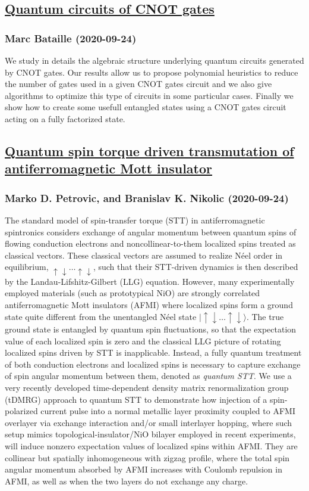 \subsection*{\href{http://arxiv.org/abs/2009.13247v2}{Quantum circuits of CNOT gates}}
\subsubsection*{Marc Bataille (2020-09-24)}
We study in details the algebraic structure underlying quantum circuits
generated by CNOT gates. Our results allow us to propose polynomial heuristics
to reduce the number of gates used in a given CNOT gates circuit and we also
give algorithms to optimize this type of circuits in some particular cases.
Finally we show how to create some usefull entangled states using a CNOT gates
circuit acting on a fully factorized state.

\subsection*{\href{http://arxiv.org/abs/2009.11833v1}{Quantum spin torque driven transmutation of antiferromagnetic Mott  insulator}}
\subsubsection*{Marko D. Petrovic, and Branislav K. Nikolic (2020-09-24)}
The standard model of spin-transfer torque (STT) in antiferromagnetic
spintronics considers exchange of angular momentum between quantum spins of
flowing conduction electrons and noncollinear-to-them localized spins treated
as classical vectors. These classical vectors are assumed to realize N\'{e}el
order in equilibrium, $\uparrow \downarrow \ldots \uparrow \downarrow$, such
that their STT-driven dynamics is then described by the Landau-Lifshitz-Gilbert
(LLG) equation. However, many experimentally employed materials (such as
prototypical NiO) are strongly correlated antiferromagnetic Mott insulators
(AFMI) where localized spins form a ground state quite different from the
unentangled N\'{e}el state $|\!\! \uparrow \downarrow \ldots \uparrow
\downarrow \rangle$. The true ground state is entangled by quantum spin
fluctuations, so that the expectation value of each localized spin is zero and
the classical LLG picture of rotating localized spins driven by STT is
inapplicable. Instead, a fully quantum treatment of both conduction electrons
and localized spins is necessary to capture exchange of spin angular momentum
between them, denoted as {\em quantum STT}. We use a very recently developed
time-dependent density matrix renormalization group (tDMRG) approach to quantum
STT to demonstrate how injection of a spin-polarized current pulse into a
normal metallic layer proximity coupled to AFMI overlayer via exchange
interaction and/or small interlayer hopping, where such setup mimics
topological-insulator/NiO bilayer employed in recent experiments, will induce
nonzero expectation values of localized spins within AFMI. They are collinear
but spatially inhomogeneous with zigzag profile, where the total spin angular
momentum absorbed by AFMI increases with Coulomb repulsion in AFMI, as well as
when the two layers do not exchange any charge.

